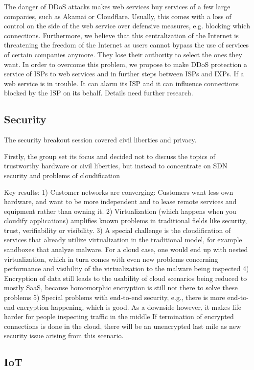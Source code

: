 The danger of \ac{DDoS} attacks makes web services buy services of a few large
companies, such as Akamai or Cloudflare. Usually, this comes with a loss of
control on the side of the web service over defensive measures, e.g. blocking
which connections. Furthermore, we believe that this centralization of the
Internet is threatening the freedom of the Internet as users cannot bypass the
use of services of certain companies anymore. They lose their authority to
select the ones they want. In order to overcome this problem, we propose to
make \ac{DDoS} protection a service of ISPs to web services and in further
steps between ISPs and IXPs. If a web service is in trouble. It can alarm its
ISP and it can influence connections blocked by the ISP on its behalf. Details
need further research.

\subsection{Security}

The security breakout session covered civil liberties and privacy.

Firstly, the group set its focus and decided not to discuss the topics of
trustworthy hardware or civil liberties, but instead to concentrate on SDN
security and problems of cloudification

Key results: 1) Customer networks are converging:  Customers want less own
hardware, and want to be more independent and to lease remote services and
equipment rather than owning it.  2) Virtualization (which happens when you
cloudify applications) amplifies known problems in traditional fields like
security, trust, verifiability or visibility.  3) A special challenge is the
cloudification of services that already utilize virtualization in the
traditional model, for example sandboxes that analyze malware.  For a cloud
case, one would end up with nested virtualization, which in turn comes with
even new problems concerning performance and visibility of the virtualization
to the malware being inspected 4) Encryption of data still leads to the
usability of cloud scenarios being reduced to mostly SaaS, because homomorphic
encryption is still not there to solve these problems 5) Special problems with
end-to-end security, e.g., there is more end-to-end encryption happening,
which is good.  As a downside however, it makes life harder for people
inspecting traffic in the middle If termination of encrypted connections is
done in the cloud, there will be an unencrypted last mile as new security
issue arising from this scenario.

\subsection{IoT}
